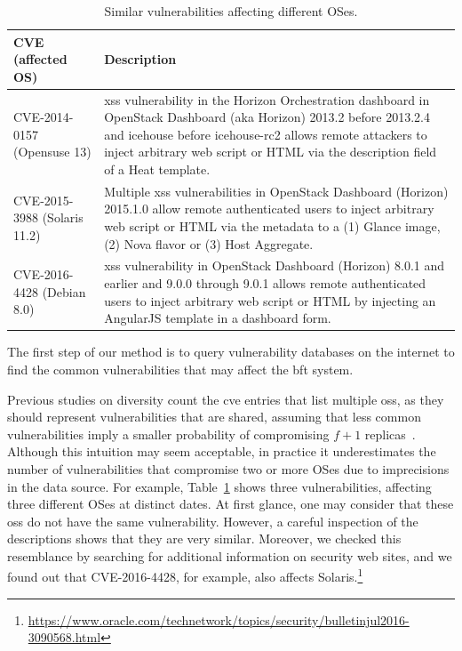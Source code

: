 \begin{table}[!t]
\begin{center}
{\small
\begin{tabular}{| p{2.8cm} | p{10.0cm} | }\hline
\textbf{CVE (affected OS)} & \textbf{Description} \\\hline\hline
CVE-2014-0157 (Opensuse 13) & \small \gls{xss} vulnerability in the Horizon Orchestration dashboard in OpenStack Dashboard (aka Horizon) 2013.2 before 2013.2.4 and icehouse before icehouse-rc2 allows remote attackers to inject arbitrary web script or HTML via the description field of a Heat template. \\ \hline
CVE-2015-3988 (Solaris 11.2) & \small Multiple \gls{xss} vulnerabilities in OpenStack Dashboard (Horizon) 2015.1.0 allow remote authenticated users to inject arbitrary web script or HTML via the metadata to a (1) Glance image, (2) Nova flavor or (3) Host Aggregate. \\ \hline
CVE-2016-4428 (Debian 8.0) & \small \gls{xss} vulnerability in OpenStack Dashboard (Horizon) 8.0.1 and earlier and 9.0.0 through 9.0.1 allows remote authenticated users to inject arbitrary web script or HTML by injecting an AngularJS template in a dashboard form. \\ \hline
\end{tabular}
}
\vspace{2mm}
\caption{Similar vulnerabilities affecting different OSes.}
\label{tab:missing_products}
\end{center}
\end{table}

The first step of our method is to query vulnerability databases on the internet to find the common vulnerabilities that may affect the \gls{bft} system.

Previous studies on diversity count the \gls{cve} entries that list multiple \glspl{os}, as they should represent vulnerabilities that are shared, assuming that less common vulnerabilities imply a smaller probability of compromising $f+1$ replicas~\cite{Garcia:2013}.
Although this intuition may seem acceptable, in practice it underestimates the number of vulnerabilities that compromise two or more OSes due to imprecisions in the data source. 
For example, Table~\ref{tab:missing_products} shows three vulnerabilities, affecting three different OSes at distinct dates.
At first glance, one may consider that these \glspl{os} do not have the same vulnerability.
However, a careful inspection of the descriptions shows that they are very similar.
Moreover, we checked this resemblance by searching for additional information on security web sites, and we found out that CVE-2016-4428, for example, also affects Solaris.\footnote{\url{https://www.oracle.com/technetwork/topics/security/bulletinjul2016-3090568.html}}

